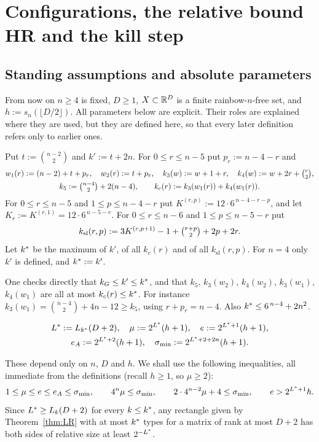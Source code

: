 \section{Configurations, the relative bound HR and the kill step}\label{sec:framework}

\subsection{Standing assumptions and absolute parameters}
From now on $n\ge4$ is fixed, $D\ge1$, $X\subset\mathbb{R}^D$ is a finite rainbow-$n$-free set, and
$h:=s_n(\lfloor D/2\rfloor)$. All parameters below are explicit. Their roles are explained where they are used,
but they are defined here, so that every later definition refers only to earlier ones.

\begin{definition}\label{def:typecounts}
Put $t:=\binom{n-2}2$ and $k':=t+2n$. For $0\le r\le n-5$ put $p_r:=n-4-r$ and
\begin{gather*}
w_1(r):=(n-2)+t+p_r,\quad w_2(r):=t+p_r,\quad k_3(w):=w+1+r,\quad k_4(w):=w+2r+\tbinom r2,\\
k_5:=\tbinom{n-4}2+2(n-4),\qquad k_c(r):=k_3(w_1(r))+k_4(w_1(r)).
\end{gather*}
For $0\le r\le n-5$ and $1\le p\le n-4-r$ put $K^{(r,p)}:=12\cdot6^{\,n-4-r-p}$, and let
$K_r:=K^{(r,1)}=12\cdot6^{\,n-5-r}$. For $0\le r\le n-6$ and $1\le p\le n-5-r$ put
\[
k_{\mathrm{sl}}(r,p):=3K^{(r,p+1)}-1+\tbinom{r+p}2+2p+2r .
\]
Let $k^{\ast}$ be the maximum of $k'$, of all $k_c(r)$ and of all $k_{\mathrm{sl}}(r,p)$. For $n=4$ only $k'$ is
defined, and $k^{\ast}:=k'$.
\end{definition}

One checks directly that $k_G\le k'\le k^{\ast}$, and that $k_5$, $k_3(w_2)$, $k_4(w_2)$, $k_3(w_1)$, $k_4(w_1)$ are all at
most $k_c(r)\le k^{\ast}$. For instance $k_3(w_1)=\binom{n-4}2+4n-12\ge k_5$, using $r+p_r=n-4$. Also
$k^{\ast}\le 6^{\,n-4}+2n^2$.

\begin{definition}\label{def:absolute}
\begin{gather*}
L^{\ast}:=L_{k^{\ast}}(D+2),\quad \mu:=2^{L^{\ast}}(h+1),\quad e:=2^{L^{\ast}+1}(h+1),\\
e_A:=2^{L^{\ast}+2}(h+1),\quad \sigma_{\min}:=2^{L^{\ast}+2+2n}(h+1).
\end{gather*}
\end{definition}
These depend only on $n$, $D$ and $h$. We shall use the following inequalities, all immediate from the
definitions (recall $h\ge1$, so $\mu\ge2$):
\begin{equation}\label{eq:absorb}
1\le\mu\le e\le e_A\le\sigma_{\min},\qquad 4^n\mu\le\sigma_{\min},\qquad 2\cdot4^{n-2}\mu+4\le\sigma_{\min},\qquad
e>2^{L^{\ast}+1}h .
\end{equation}
Since $L^{\ast}\ge L_{k}(D+2)$ for every $k\le k^{\ast}$, any rectangle given by Theorem~\ref{thm:LR} with at most $k^{\ast}$ types
for a matrix of rank at most $D+2$ has both sides of relative size at least $2^{-L^{\ast}}$.

